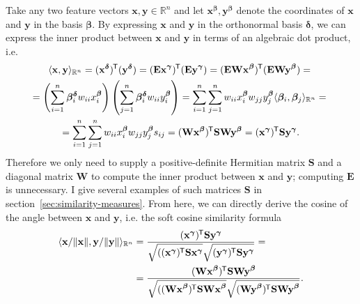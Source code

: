 \documentclass[
  digital, %
  notable, %
  lof,     %
  lot,     %
  nopalatino, color
]{fithesis3}
\newcommand*{\tran}{^{\mkern-1.5mu\mathsf{T}}}
\begin{document}
Take any two feature vectors $\mathbf x, \mathbf y\in\mathbb R^n$ and let
$\mathbf x^{\bm{\beta}}, \mathbf y^{\bm{\beta}}$ denote the coordinates of
$\mathbf x$ and $\mathbf y$ in the basis $\bm\beta$.
By expressing $\mathbf x$ and $\mathbf y$ in the orthonormal basis
$\bm\delta$, we can express the inner product between
$\mathbf x$ and $\mathbf y$ in terms of an algebraic dot product,
i.e.\begin{multline}
  \label{eq:similarity-inner-product}
  \langle\mathbf x, \mathbf y\rangle_{\mathbb R^n}
  = (\mathbf{x}^{\bm\delta})\tran (\mathbf{y}^{\bm\delta})
  = (\mathbf{Ex}^{\bm\gamma})\tran (\mathbf{Ey}^{\bm\gamma})
  = (\mathbf{EWx}^{\bm\beta})\tran (\mathbf{EWy}^{\bm\beta}) ={} \\
  = \left(\sum_{i=1}^n \bm{\beta}_i^{\bm\delta}w_{ii}x_i^{\bm\beta}\right)\left(\sum_{j=1}^n\bm{\beta}_i^{\bm\delta}w_{ii} y_i^{\bm\beta}\right)
  = \sum_{i=1}^n\sum_{j=1}^nw_{ii}x_i^{\bm\beta}w_{jj}y_j^{\bm\beta} \langle\bm\beta_i, \bm\beta_j\rangle_{\mathbb R^n} ={} \\
  = \sum_{i=1}^n\sum_{j=1}^nw_{ii}x_i^{\bm\beta}w_{jj}y_j^{\bm\beta} s_{ij}
  = (\mathbf{Wx}^{\bm\beta})\tran \mathbf S\mathbf{Wy}^{\bm\beta}
  = (\mathbf{x}^{\bm\gamma})\tran \mathbf S\mathbf{y}^{\bm\gamma}.
\end{multline}
Therefore we only need to supply a positive-definite Hermitian matrix $\mathbf{S}$ and a diagonal matrix $\mathbf W$ to compute the inner
product between $\mathbf x$ and $\mathbf y$; computing $\mathbf E$
 is unnecessary. I give several examples of such matrices
$\mathbf S$ in section~\ref{sec:similarity-measures}. From here, we can
directly derive the cosine of the angle between $\mathbf x$ and $\mathbf y$,
i.e. the soft cosine similarity formula
\begin{equation}
\label{eq:similarity-soft-cosine}
\begin{aligned}
  \langle\mathbf x/\Vert\mathbf x\Vert, \mathbf y/\Vert\mathbf y\Vert\rangle_{\mathbb R^n} &= 
  \frac{(\mathbf x^{\bm\gamma})\tran\mathbf S\mathbf y^{\bm\gamma}}{\sqrt{\strut((\mathbf x^{\bm\gamma})\tran\mathbf S\mathbf x^{\bm\gamma}}\sqrt{\strut(\mathbf y^{\bm\gamma})\tran\mathbf S\mathbf y^{\bm\gamma}}} = \\
  &= \frac{(\mathbf{Wx}^{\bm\beta})\tran\mathbf S\mathbf{Wy}^{\bm\beta}}{\sqrt{\strut((\mathbf{Wx}^{\bm\beta})\tran\mathbf S\mathbf{Wx}^{\bm\beta}}\sqrt{\strut(\mathbf{Wy}^{\bm\beta})\tran\mathbf S\mathbf{Wy}^{\bm\beta}}}.
\end{aligned}
\end{equation}
\end{document}
